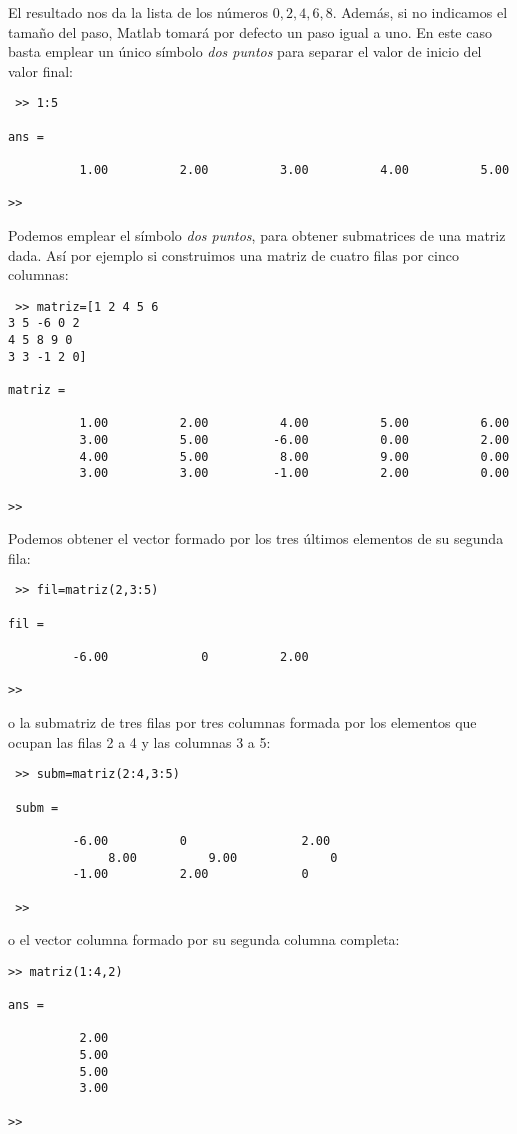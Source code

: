 El resultado nos da la lista de los números $0, 2, 4, 6, 8$.
Además, si no indicamos el tamaño del paso,  Matlab tomará por defecto un paso igual a uno. En este caso basta emplear un único símbolo \emph{dos puntos} para separar el valor de inicio del valor final:
 \begin{verbatim}
 >> 1:5

ans =

          1.00          2.00          3.00          4.00          5.00

>>
 \end{verbatim}
 
 Podemos emplear el símbolo \emph{dos puntos},  para obtener submatrices de una matriz dada. Así por ejemplo si construimos una matriz de cuatro filas por cinco columnas:
 \begin{verbatim}
 >> matriz=[1 2 4 5 6
3 5 -6 0 2
4 5 8 9 0
3 3 -1 2 0]

matriz =

          1.00          2.00          4.00          5.00          6.00
          3.00          5.00         -6.00          0.00          2.00
          4.00          5.00          8.00          9.00          0.00
          3.00          3.00         -1.00          2.00          0.00

>> 
 \end{verbatim}
 Podemos obtener el vector formado por los tres últimos elementos de su segunda fila:
 \begin{verbatim}
 >> fil=matriz(2,3:5)

fil =

         -6.00             0          2.00

>> 
 \end{verbatim}

 o la submatriz de tres filas por tres columnas formada por los elementos que ocupan las filas 2 a 4 y las columnas 3 a 5:
\begin{verbatim}
 >> subm=matriz(2:4,3:5)

 subm =

         -6.00          0                2.00
	          8.00          9.00             0  
         -1.00          2.00             0  

 >> 
\end{verbatim}

o el vector columna formado por su segunda columna completa:
\begin{verbatim}
>> matriz(1:4,2)

ans =

          2.00
          5.00
          5.00
          3.00

>> 
\end{verbatim} 

